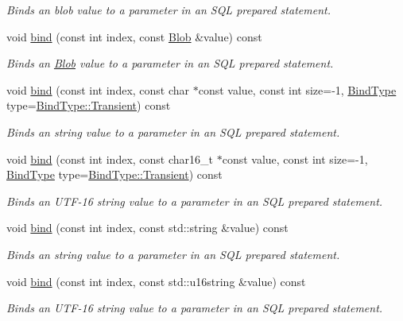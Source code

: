 \begin{DoxyCompactItemize}
\begin{DoxyCompactList}\small\item\em Binds an blob value to a parameter in an S\-Q\-L prepared statement. \end{DoxyCompactList}\item 
void \hyperlink{a00013_afc5e0d9485bfedc71e9863cdb3c3d11a}{bind} (const int index, const \hyperlink{a00002}{Blob} \&value) const 
\begin{DoxyCompactList}\small\item\em Binds an \hyperlink{a00002}{Blob} value to a parameter in an S\-Q\-L prepared statement. \end{DoxyCompactList}\item 
void \hyperlink{a00013_a3ed628586d99205a1443790e7dc1e36f}{bind} (const int index, const char $\ast$const value, const int size=-\/1, \hyperlink{a00038_a32877e51b309dd8f2a28c21c0ba4a6fd}{Bind\-Type} type=\hyperlink{a00038_a32877e51b309dd8f2a28c21c0ba4a6fdab1f023eff9a6b5308d6024e4c6b3d475}{Bind\-Type\-::\-Transient}) const 
\begin{DoxyCompactList}\small\item\em Binds an string value to a parameter in an S\-Q\-L prepared statement. \end{DoxyCompactList}\item 
void \hyperlink{a00013_a6b983503e072b56f2255b140dd271381}{bind} (const int index, const char16\-\_\-t $\ast$const value, const int size=-\/1, \hyperlink{a00038_a32877e51b309dd8f2a28c21c0ba4a6fd}{Bind\-Type} type=\hyperlink{a00038_a32877e51b309dd8f2a28c21c0ba4a6fdab1f023eff9a6b5308d6024e4c6b3d475}{Bind\-Type\-::\-Transient}) const 
\begin{DoxyCompactList}\small\item\em Binds an U\-T\-F-\/16 string value to a parameter in an S\-Q\-L prepared statement. \end{DoxyCompactList}\item 
void \hyperlink{a00013_a2e33406ed4170291b9e3da490383a224}{bind} (const int index, const std\-::string \&value) const 
\begin{DoxyCompactList}\small\item\em Binds an string value to a parameter in an S\-Q\-L prepared statement. \end{DoxyCompactList}\item 
void \hyperlink{a00013_a0a2d97dc865a1ebefb58f982fe5689a0}{bind} (const int index, const std\-::u16string \&value) const 
\begin{DoxyCompactList}\small\item\em Binds an U\-T\-F-\/16 string value to a parameter in an S\-Q\-L prepared statement. \end{DoxyCompactList}\item 

\end{DoxyCompactItemize}
